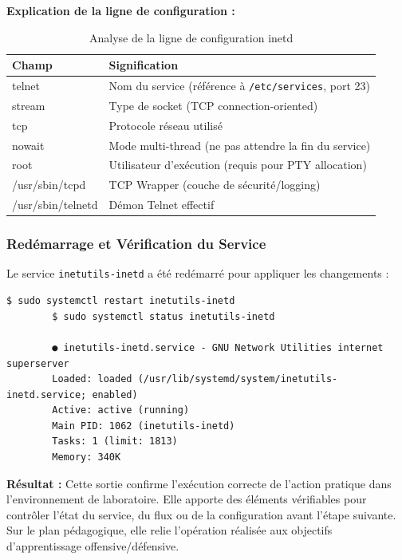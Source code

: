 \documentclass[12pt,a4paper,openany]{report}
\newcommand{\tableheadcolor}{\rowcolor{tableheadbg}}
\begin{document}
	
	\textbf{Explication de la ligne de configuration :}
	\begin{table}[H]
		\centering
		\small
		\renewcommand{\arraystretch}{1.4}
		\begin{tabular}{>{\ttfamily}p{3cm} p{10cm}}
			\arrayrulecolor{tableborder}
			\hline
			\tableheadcolor
			\textcolor{tableheadfg}{\textbf{Champ}} &
			\textcolor{tableheadfg}{\textbf{Signification}} \\
			\hline
			\rowcolor{tablerowalt}
			telnet & Nom du service (référence à \texttt{/etc/services}, port 23) \\
			stream & Type de socket (TCP connection-oriented) \\
			\rowcolor{tablerowalt}
			tcp & Protocole réseau utilisé \\
			nowait & Mode multi-thread (ne pas attendre la fin du service) \\
			\rowcolor{tablerowalt}
			root & Utilisateur d'exécution (requis pour PTY allocation) \\
			/usr/sbin/tcpd & TCP Wrapper (couche de sécurité/logging) \\
			\rowcolor{tablerowalt}
			/usr/sbin/telnetd & Démon Telnet effectif \\
			\hline
		\end{tabular}
		\caption{Analyse de la ligne de configuration inetd}
		\label{tab:inetd-config-analysis}
	\end{table}
	
	\subsubsection{Redémarrage et Vérification du Service}
	Le service \texttt{inetutils-inetd} a été redémarré pour appliquer les changements :
	
	\begin{lstlisting}[caption=Redémarrage du service inetd]
		$ sudo systemctl restart inetutils-inetd
		$ sudo systemctl status inetutils-inetd
		
		● inetutils-inetd.service - GNU Network Utilities internet superserver
		Loaded: loaded (/usr/lib/systemd/system/inetutils-inetd.service; enabled)
		Active: active (running)
		Main PID: 1062 (inetutils-inetd)
		Tasks: 1 (limit: 1813)
		Memory: 340K
	\end{lstlisting}
	
	\textbf{Résultat :} Cette sortie confirme l'exécution correcte de l'action pratique dans l'environnement de laboratoire. Elle apporte des éléments vérifiables pour contrôler l'état du service, du flux ou de la configuration avant l'étape suivante. Sur le plan pédagogique, elle relie l'opération réalisée aux objectifs d'apprentissage offensive/défensive.
	
\end{document}
